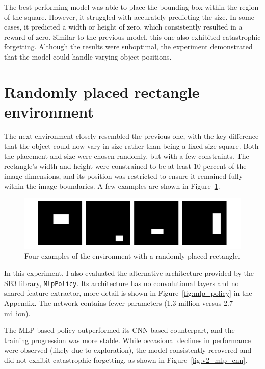 \documentclass[
  digital,     %
  oneside,     %
  nosansbold,  %
  nocolorbold, %
  lof,         %
  lot,         %
]{fithesis4}
\begin{document}
The best-performing model was able to place the bounding box within the region of the square. However, it struggled with accurately predicting the size. In some cases, it predicted a width or height of zero, which consistently resulted in a reward of zero. Similar to the previous model, this one also exhibited catastrophic forgetting. Although the results were suboptimal, the experiment demonstrated that the model could handle varying object positions.

\section{Randomly placed rectangle environment}
\label{sec:moving_rectangle}
The next environment closely resembled the previous one, with the key difference that the object could now vary in size rather than being a fixed-size square. Both the placement and size were chosen randomly, but with a few constraints. The rectangle’s width and height were constrained to be at least 10 percent of the image dimensions, and its position was restricted to ensure it remained fully within the image boundaries. A few examples are shown in Figure~\ref{fig:env2}.

\begin{figure}[h]
    \includegraphics[width=1\linewidth]{env_examples/env2.pdf}
    \caption{Four examples of the environment with a randomly placed rectangle.}
    \label{fig:env2}
\end{figure}

In this experiment, I also evaluated the alternative architecture provided by the SB3 library, \texttt{MlpPolicy}. Its architecture has no convolutional layers and no shared feature extractor, more detail is shown in Figure~\ref{fig:mlp_policy} in the Appendix. The network contains fewer parameters (1.3 million versus 2.7 million).

The MLP-based policy outperformed its CNN-based counterpart, and the training progression was more stable. While occasional declines in performance were observed (likely due to exploration), the model consistently recovered and did not exhibit catastrophic forgetting, as shown in Figure~\ref{fig:v2_mlp_cnn}.
\end{document}

